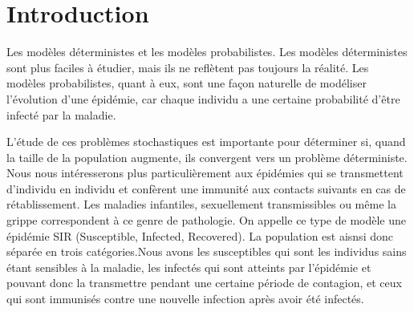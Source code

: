 \chapter{Introduction}

Les modèles déterministes et les modèles probabilistes. Les modèles déterministes sont plus faciles à étudier, mais ils ne reflètent pas toujours la réalité. Les modèles probabilistes, quant à eux, sont une façon naturelle de modéliser l’évolution d’une épidémie, car chaque individu a une certaine probabilité d’être infecté par la maladie.

L’étude de ces problèmes stochastiques est importante pour déterminer si, quand la taille de la population augmente, ils convergent vers un problème déterministe. Nous nous intéresserons plus particulièrement aux épidémies qui se transmettent d’individu en individu et confèrent une immunité aux contacts suivants en cas de rétablissement. Les maladies infantiles, sexuellement transmissibles ou même la grippe correspondent à ce genre de pathologie. On appelle ce type de modèle une épidémie SIR (Susceptible, Infected, Recovered). La population est aisnsi donc séparée en trois catégories.Nous avons les susceptibles qui sont les individus sains étant sensibles à la maladie, les infectés qui sont atteints par l’épidémie et pouvant donc la transmettre pendant une certaine période de contagion, et ceux qui sont immunisés contre une nouvelle infection après avoir été infectés.